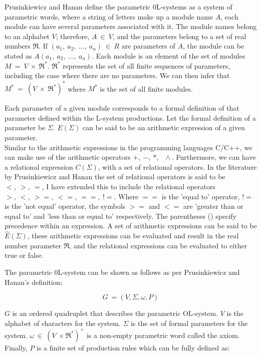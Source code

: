 Prusinkiewicz and Hanan define the parametric 0L-systems as a system of parametric words, where a string of letters make up a module name $A$, each module can have several parameters associated with it. The module names belong to an alphabet $V$; therefore, $A~ \in~ V$, and the parameters belong to a set of real numbers $\Re$. If $(a_1,~ a_2,~ ...,~ a_n)~ \in~ R$ are parameters of $A$, the module can be stated as $A(a_1,~ a_2,~ ...,~ a_n)$. Each module is an element of the set of modules $M~ =~ V~ \times~ \Re^*$. $\Re^*$ represents the set of all finite sequences of parameters, including the case where there are no parameters. We can then infer that $M^*~ =~ (V~ \times~ \Re^*)^*$ where $M^*$ is the set of all finite modules. 

Each parameter of a given module corresponds to a formal definition of that parameter defined within the L-system productions. Let the formal definition of a parameter be $\Sigma$. $ E(\Sigma) $ can be said to be an arithmetic expression of a given parameter.\\ Similar to the arithmetic expressions in the programming languages C/C++, we can make use of the arithmetic operators $ +,~ -,~ *,~ \,~ \wedge{}$. Furthermore, we can have a relational expression $C(\Sigma)$, with a set of relational operators. In the literature by Prusinkiewicz and Hanan the set of relational operators is said to be $<,~ >,~ =$, I have extended this to include the relational operators $>,~ <,~ >=,~ <=,~ ==,~ !=$. Where $==$ is the 'equal to' operator, $!=$ is the 'not equal' operator, the symbols $>=$ and $<=$ are 'greater than or equal to' and 'less than or equal to' respectively. The parentheses () specify precedence within an expression. A set of arithmetic expressions can be said to be $\hat{E} (\Sigma)$,  these arithmetic expressions can be evaluated and result in the real number parameter $\Re $, and the relational expressions can be evaluated to either true or false. 

\newpage
\noindent
The parametric 0L-system can be shown as follows as per Prusinkiewicz and Hanan's definition:

\begin{equation}
G~ = (V, \Sigma, \omega, P)
\end{equation}
\vspace{5mm}

\noindent
$G$ is an ordered quadruplet that describes the parametric OL-system. $V$ is the alphabet of characters for the system. $\Sigma$ is the set of formal parameters for the system. $\omega~ \in~ (V~ \times \Re^*)^+$ is a non-empty parametric word called the axiom. Finally, $P$ is a finite set of production rules which can be fully defined as:

